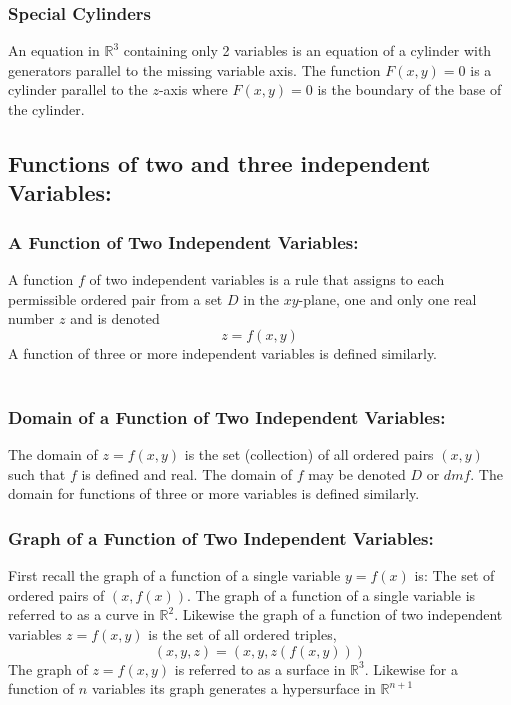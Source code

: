 \documentclass[14pt]{article}
\begin{document}
    \subsubsection{Special Cylinders}
    An equation in $\mathbb{R}^3$ containing only 2 variables is an
    equation of a cylinder with generators parallel to the missing
    variable axis. The function $F(x,y)=0$ is a cylinder parallel to the
    $z$-axis where $F(x,y)=0$ is the boundary of the base of the
    cylinder.
    \subsection{Functions of two and three independent Variables:}
    \subsubsection{A Function of Two Independent Variables:}
    A function $f$ of two independent variables is a rule that assigns
    to each permissible ordered pair from a set $D$ in the $xy$-plane,
    one and only one real number $z$ and is denoted
    $$z=f(x,y)$$ A function of three or more independent variables is
    defined similarly.\\\\
    \subsubsection{Domain of a Function of Two Independent Variables:}
    The domain of $z=f(x,y)$ is the set (collection) of all ordered
    pairs $(x,y)$ such that $f$ is defined and real. The domain of $f$
    may be denoted $D$ or $dmf$. The domain for functions of three or
    more variables is defined similarly.
    \subsubsection{Graph of a Function of Two Independent Variables:}
    First recall the graph of a function of a single variable $y=f(x)$
    is: The set of ordered pairs of $(x,f(x))$. The graph of a function
    of a single variable is referred to as a curve in $\mathbb{R}^2$.
    Likewise the graph of a function of two independent variables
    $z=f(x,y)$ is the set of all ordered triples,
    $$(x,y,z)=(x,y,z(f(x,y)))$$ The graph of $z=f(x,y)$ is referred to
    as a surface in $\mathbb{R}^3$. Likewise for a function of $n$
    variables its graph generates a hypersurface in
    $\mathbb{R}^{n+1}$\\\\
\end{document}
